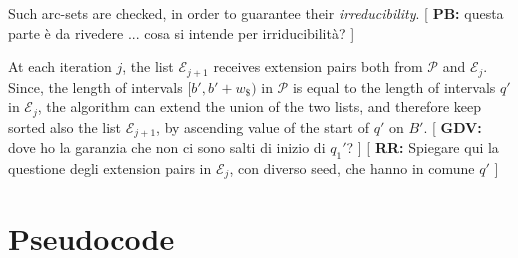 \documentclass[runningheads,envcountsame,a4paper]{llncs}
\newcommand{\notaestesa}[2]{%
 \marginpar{\color{red!75!black}\textbf{\texttimes}}%
 {\color{red!75!black}%
 [\,\textbullet\,\textsf{\textbf{#1:}} %
 \textsf{\footnotesize#2}\,\textbullet\,]}%
}
\begin{document}
Such arc-sets are checked, in order to guarantee their
\emph{irreducibility}.
\notaestesa{PB}{questa parte è da rivedere ... cosa si intende per
  irriducibilità?}

At each iteration $j$, the list $\mathcal{E}_{j+1}$ receives extension
pairs both from $\mathcal{P}$ and $\mathcal{E}_{j}$.
Since, the length of intervals $[b', b'+w_\$)$ in $\mathcal{P}$ is
equal to the length of intervals $q'$ in $\mathcal{E}_{j}$, the
algorithm can extend the union of the two lists, and therefore keep
sorted also the list $\mathcal{E}_{j+1}$, by ascending value of the
start of $q'$ on $B'$.\notaestesa{GDV}{ dove ho la
  garanzia che non ci sono salti di inizio di $q_{1}'$?} \notaestesa{RR}{Spiegare qui la questione degli extension pairs in $\mathcal{E}_j$, con diverso seed, che hanno in comune $q'$}








\section*{Pseudocode}
\end{document}
